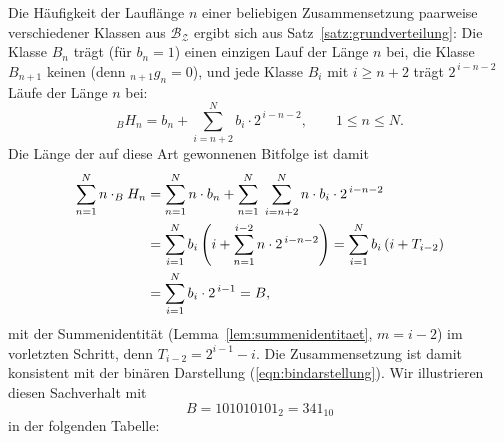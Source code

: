 \documentclass[11pt,a4paper]{scrartcl}
\theoremstyle{plain}
\theoremstyle{definition}
\theoremstyle{remark}
\begin{document}
Die Häufigkeit der Lauflänge $n$ einer beliebigen Zusammensetzung
paarweise verschiedener Klassen aus $\mathcal{B_Z}$ ergibt sich aus Satz~\ref{satz:grundverteilung}: Die Klasse $B_n$ trägt
(für $b_n=1$) einen einzigen Lauf der Länge $n$ bei, die Klasse
$B_{n+1}$ keinen (denn $_{n+1}g_n=0$), und jede Klasse $B_i$ mit
$i\geq n+2$ trägt $2^{\,i-n-2}$ Läufe der Länge $n$ bei:
\begin{equation}\label{eqn:hnformel}
  _BH_n=b_n+\sum_{i=n+2}^{N} b_{i}\cdot 2^{\,i-n-2},\qquad 1\leq n\leq N.
\end{equation}
Die Länge der auf diese Art gewonnenen Bitfolge ist damit
\begin{align}
  \sum_{n=1}^{N} n\cdot _BH_n
  &= \sum_{n=1}^{N} n\cdot b_n+\sum_{n=1}^{N}\;\sum_{i=n+2}^{N}
     n\cdot b_{i}\cdot 2^{\,i-n-2}\notag\\
  &= \sum_{i=1}^{N} b_i\left(i+\sum_{n=1}^{i-2} n\cdot 2^{\,i-n-2}\right)
   = \sum_{i=1}^{N} b_i\left(i+T_{i-2}\right)\notag\\
  &= \sum_{i=1}^{N} b_i\cdot 2^{\,i-1}=B,\label{eqn:laengekonsistenz}
\end{align}
mit der Summenidentität (Lemma~\ref{lem:summenidentitaet}, $m=i-2$) im
vorletzten Schritt, denn $T_{i-2}=2^{i-1}-i$. Die Zusammensetzung ist
damit konsistent mit der binären Darstellung
(\ref{eqn:bindarstellung}). Wir illustrieren diesen Sachverhalt mit
\begin{equation}
  B=101010101_2=341_{10}
\end{equation}
in der folgenden Tabelle:
\end{document}
